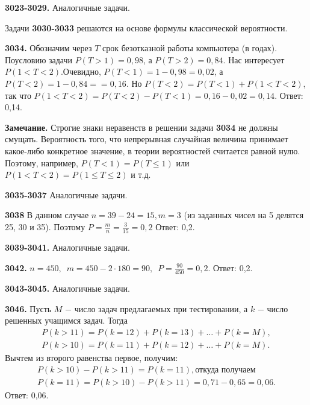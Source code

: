 \textbf{3023-3029.} Аналогичные задачи.

Задачи \textbf{3030-3033} решаются на основе формулы классической вероятности.

\textbf{3034.} Обозначим через $T$ срок безотказной работы компьютера (в годах). Поусловию задачи $P(T>1)=0,98$, а $P(T>2)=0,84.$ Нас интересует $P(1<T<2)$.\newline Очевидно, $P(T<1)=1-0,98=0,02$, а $P(T<2)=1-0,84=$\newline$=0,16$. Но $P(T<2)=P(T<1)+P(1<T<2)$, так что \newline$P(1<T<2)=P(T<2)-P(T<1)=0,16-0,02=0,14.$ \newline \null \hspace*{\fill} Ответ: 0,14. 

\textbf{Замечание.} Строгие знаки неравенств в решении задачи \textbf{3034} не должны смущать. Вероятность того, что непрерывная случайная величина принимает какое-либо конкретное значение, в теории вероятностей считается равной нулю. Поэтому, например, $P(T<1)=P(T\leq1)$ или $P(1<T<2)=P(1\leq T\leq2)$ и т.д.

\textbf{3035-3037} Аналогичные задачи.

\textbf{3038} В данном случае $n=39-24=15, m=3$ (из заданных чисел на 5 делятся 25, 30 и 35). Поэтому $P=\frac{m}{n}=\frac{3}{15}=0,2$ \newline \null \hspace*{\fill} Ответ: 0,2. 

\textbf{3039-3041.} Аналогичные задачи.

\textbf{3042.} $n=450,\enspace m=450-2\cdot180=90,\enspace P=\frac{90}{450}=0,2.$ \newline \null \hspace*{\fill} Ответ: 0,2. 

\textbf{3043-3045.} Аналогичные задачи.

\textbf{3046.} Пусть $M$ $-$ число задач предлагаемых при тестировании, а $k$ $-$ число решенных учащимся задач. Тогда
\begin{eqnarray*}
	P(k>11)=P(k=12)+P(k=13)+\dots+P(k=M),\\
	P(k>10)=P(k=11)+P(k=12)+\dots+P(k=M).
\end{eqnarray*}
Вычтем из второго равенства первое, получим:
\begin{eqnarray*}
	P(k>10)-P(k>11)=P(k=11), \text{откуда получаем}\\
	P(k=11)=P(k>10)-P(k>11)=0,71-0,65=0,06.
\end{eqnarray*}
\newline \null \hspace*{\fill} Ответ: 0,06. 

